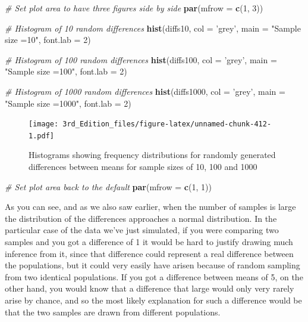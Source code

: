 \documentclass[
]{book}
\newenvironment{Shaded}{\begin{snugshade}}{\end{snugshade}}
\newcommand{\CommentTok}[1]{\textcolor[rgb]{0.56,0.35,0.01}{\textit{#1}}}
\newcommand{\DataTypeTok}[1]{\textcolor[rgb]{0.13,0.29,0.53}{#1}}
\newcommand{\DecValTok}[1]{\textcolor[rgb]{0.00,0.00,0.81}{#1}}
\newcommand{\KeywordTok}[1]{\textcolor[rgb]{0.13,0.29,0.53}{\textbf{#1}}}
\newcommand{\NormalTok}[1]{#1}
\newcommand{\StringTok}[1]{\textcolor[rgb]{0.31,0.60,0.02}{#1}}
\begin{document}
\begin{Shaded}
\begin{Highlighting}[]

\CommentTok{# Set plot area to have three figures side by side}
\KeywordTok{par}\NormalTok{(}\DataTypeTok{mfrow =} \KeywordTok{c}\NormalTok{(}\DecValTok{1}\NormalTok{, }\DecValTok{3}\NormalTok{))}

\CommentTok{# Histogram of 10 random differences}
\KeywordTok{hist}\NormalTok{(diffs10,}
     \DataTypeTok{col =} \StringTok{'grey'}\NormalTok{,}
     \DataTypeTok{main =} \StringTok{"Sample size =10"}\NormalTok{,}
     \DataTypeTok{font.lab =} \DecValTok{2}\NormalTok{)}

\CommentTok{# Histogram of 100 random differences}
\KeywordTok{hist}\NormalTok{(diffs100,}
     \DataTypeTok{col =} \StringTok{'grey'}\NormalTok{,}
     \DataTypeTok{main =} \StringTok{"Sample size =100"}\NormalTok{,}
     \DataTypeTok{font.lab =} \DecValTok{2}\NormalTok{)}

\CommentTok{# Histogram of 1000 random differences}
\KeywordTok{hist}\NormalTok{(diffs1000,}
     \DataTypeTok{col =} \StringTok{'grey'}\NormalTok{,}
     \DataTypeTok{main =} \StringTok{"Sample size =1000"}\NormalTok{,}
     \DataTypeTok{font.lab =} \DecValTok{2}\NormalTok{)}
\end{Highlighting}
\end{Shaded}

\begin{figure}
\centering
\texttt{[image: 3rd\_Edition\_files/figure-latex/unnamed-chunk-412-1.pdf]}
\caption{\label{fig:unnamed-chunk-412}Histograms showing frequency distributions for randomly generated differences between means for sample sizes of 10, 100 and 1000}
\end{figure}

\begin{Shaded}
\begin{Highlighting}[]

\CommentTok{# Set plot area back to the default}
\KeywordTok{par}\NormalTok{(}\DataTypeTok{mfrow =} \KeywordTok{c}\NormalTok{(}\DecValTok{1}\NormalTok{, }\DecValTok{1}\NormalTok{))}
\end{Highlighting}
\end{Shaded}

As you can see, and as we also saw earlier, when the number of samples is large the distribution of the differences approaches a normal distribution. In the particular case of the data we've just simulated, if you were comparing two samples and you got a difference of 1 it would be hard to justify drawing much inference from it, since that difference could represent a real difference between the populations, but it could very easily have arisen because of random sampling from two identical populations. If you got a difference between means of 5, on the other hand, you would know that a difference that large would only very rarely arise by chance, and so the most likely explanation for such a difference would be that the two samples are drawn from different populations.
\end{document}
